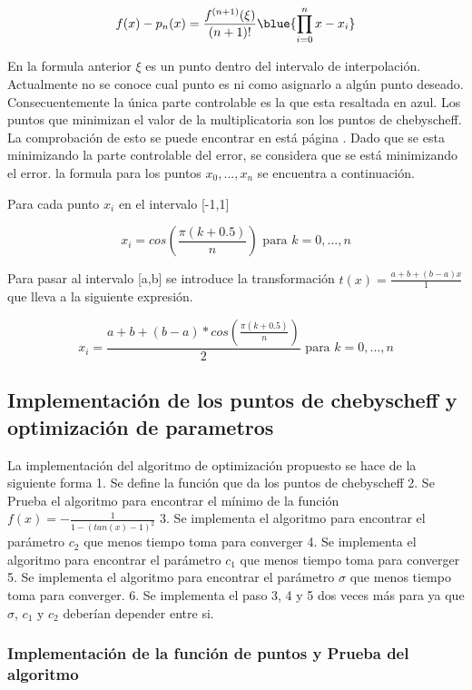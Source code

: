 \documentclass[11pt]{article}
\begin{document}
\[f(x) - p_n(x) = \frac{f^{(n + 1)}(\xi)}{(n+1)!} \blue {\prod_{i=0}^n{x-x_i}} \]

En la formula anterior \(\xi\) es un punto dentro del intervalo de
interpolación. Actualmente no se conoce cual punto es ni como asignarlo
a algún punto deseado. Consecuentemente la única parte controlable es la
que esta resaltada en azul. Los puntos que minimizan el valor de la
multiplicatoria son los puntos de chebyscheff. La comprobación de esto
se puede encontrar en está página . Dado que se esta minimizando la
parte controlable del error, se considera que se está minimizando el
error. la formula para los puntos \({x_0,..., x_n}\) se encuentra a
continuación.

Para cada punto \(x_i\) en el intervalo {[}-1,1{]}

\[x_i = cos (\frac{\pi (k + 0.5)}{n}) \text{ para } k = 0,...,n \]

Para pasar al intervalo {[}a,b{]} se introduce la transformación
\(t(x) = \frac{a + b + (b-a)x}{1}\) que lleva a la siguiente expresión.

\[x_i = \frac{a + b + (b-a)*cos (\frac{\pi (k + 0.5)}{n})}{2} \text{ para } k = 0,...,n \]

    \hypertarget{implementaciuxf3n-de-los-puntos-de-chebyscheff-y-optimizaciuxf3n-de-parametros}{%
\subsection{Implementación de los puntos de chebyscheff y optimización
de
parametros}\label{implementaciuxf3n-de-los-puntos-de-chebyscheff-y-optimizaciuxf3n-de-parametros}}

La implementación del algoritmo de optimización propuesto se hace de la
siguiente forma 1. Se define la función que da los puntos de chebyscheff
2. Se Prueba el algoritmo para encontrar el mínimo de la función
\(f(x) = - \frac{1}{1-(tan(x)-1)^2}\) 3. Se implementa el algoritmo para
encontrar el parámetro \(c_2\) que menos tiempo toma para converger 4.
Se implementa el algoritmo para encontrar el parámetro \(c_1\) que menos
tiempo toma para converger 5. Se implementa el algoritmo para encontrar
el parámetro \(\sigma\) que menos tiempo toma para converger. 6. Se
implementa el paso 3, 4 y 5 dos veces más para ya que \(\sigma\),
\(c_1\) y \(c_2\) deberían depender entre si.

    \hypertarget{implementaciuxf3n-de-la-funciuxf3n-de-puntos-y-prueba-del-algoritmo}{%
\subsubsection{Implementación de la función de puntos y Prueba del
algoritmo}\label{implementaciuxf3n-de-la-funciuxf3n-de-puntos-y-prueba-del-algoritmo}}
\end{document}

